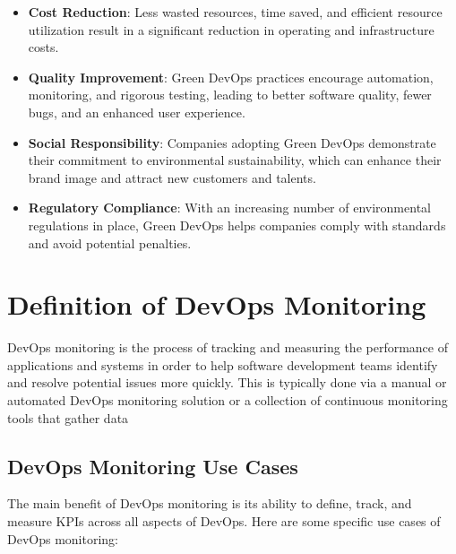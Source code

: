 \begin{itemize}
  \item \textbf{Cost Reduction}: Less wasted resources, time saved, and efficient resource utilization result in a significant reduction in operating and infrastructure costs.
  
  \item \textbf{Quality Improvement}: Green DevOps practices encourage automation, monitoring, and rigorous testing, leading to better software quality, fewer bugs, and an enhanced user experience.
  
  \item \textbf{Social Responsibility}: Companies adopting Green DevOps demonstrate their commitment to environmental sustainability, which can enhance their brand image and attract new customers and talents.
  
  \item \textbf{Regulatory Compliance}: With an increasing number of environmental regulations in place, Green DevOps helps companies comply with standards and avoid potential penalties.
\end{itemize}

\section{Definition of DevOps Monitoring}
DevOps monitoring is the process of tracking and measuring the performance of applications and systems in order to help software development teams identify and resolve potential issues more quickly. This is typically done via a manual or automated DevOps monitoring solution or a collection of continuous monitoring tools that gather data

\subsection{DevOps Monitoring Use Cases}

The main benefit of DevOps monitoring is its ability to define, track, and measure KPIs across all aspects of DevOps. Here are some specific use cases of DevOps monitoring:

